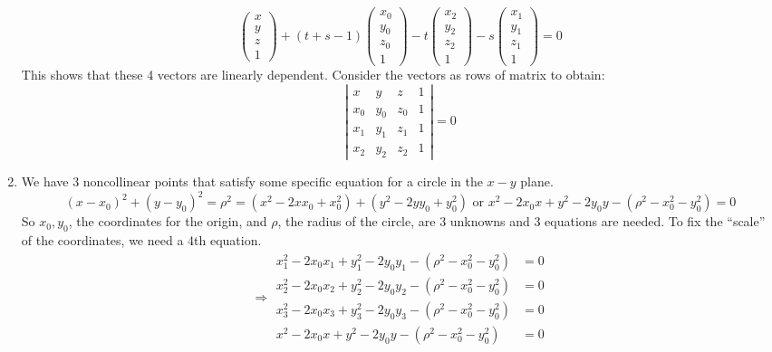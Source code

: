 \documentclass[twoside]{amsart}
\theoremstyle{plain}
\theoremstyle{definition}
\begin{document}
\begin{enumerate}
\[  \left( \begin{matrix} x \\ y \\ z \\ 1 \end{matrix} \right) + (t+s-1) \left( \begin{matrix} x_0 \\ y_0 \\ z_0 \\ 1 \end{matrix} \right) -t \left( \begin{matrix} x_2 \\ y_2 \\ z_2 \\ 1 \end{matrix} \right) - s\left( \begin{matrix} x_1 \\ y_1 \\ z_1 \\ 1 \end{matrix} \right) = 0 
\]
This shows that these 4 vectors are linearly dependent.  Consider the vectors as rows of matrix to obtain:
\[
\left| \begin{matrix} x & y & z & 1 \\ x_0 & y_0 & z_0 & 1 \\ x_1 & y_1 & z_1 & 1 \\ x_2 & y_2 & z_2 & 1 \end{matrix} \right| = 0 
\]
\item We have 3 noncollinear points that satisfy some specific equation for a circle in the $x-y$ plane.  
\[
(x-x_0)^2 + (y-y_0)^2 = \rho^2 = (x^2 - 2xx_0 + x_0^2) + (y^2 - 2yy_0 + y_0^2) \text{ or } x^2 - 2x_0 x + y^2 - 2y_0 y - (\rho^2 - x_0^2 - y_0^2) = 0
\]
So $x_0, y_0$, the coordinates for the origin, and $\rho$, the radius of the circle, are 3 unknowns and 3 equations are needed.  To fix the ``scale'' of the coordinates, we need a 4th equation.  
\[
\Longrightarrow \begin{aligned} x_1^2 - 2x_0 x_1 + y_1^2 - 2y_0 y_1 - (\rho^2 - x_0^2 - y_0^2) & = 0 \\
  x_2^2 - 2x_0 x_2 + y_2^2 - 2y_0 y_2 - (\rho^2 - x_0^2 - y_0^2) & = 0 \\
x_3^2 - 2x_0 x_3 + y_3^2 - 2y_0 y_3 - (\rho^2 - x_0^2 - y_0^2) & = 0 \\
x^2 - 2x_0 x + y^2 - 2y_0 y - (\rho^2 - x_0^2 - y_0^2) & = 0

\end{aligned}\]
\end{enumerate}
\end{document}
